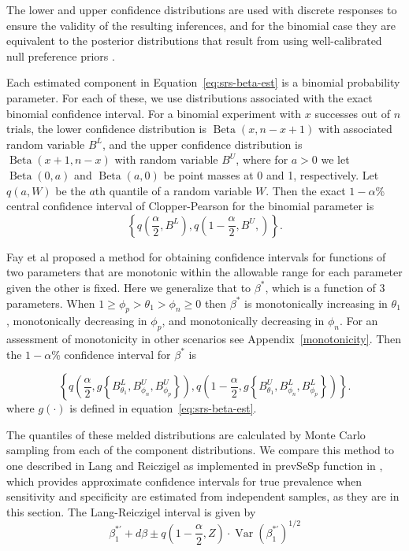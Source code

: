 \documentclass[AMA,STIX1COL]{WileyNJD-v2}
\DeclareMathOperator{\Var}{Var}
\begin{document}
The lower and upper confidence distributions are used with discrete responses to ensure the validity of the resulting inferences, and for the binomial case they are equivalent to the posterior distributions that result from using well-calibrated null preference priors \cite{Fay2021}.

Each estimated component in Equation~\ref{eq:srs-beta-est} is a binomial probability parameter.
For each of these, we use distributions associated with  the exact binomial confidence interval.
For a binomial experiment with \( x \) successes out of \( n \) trials, the lower confidence distribution is \( \operatorname{Beta}(x, n - x + 1) \) with associated random variable \( B^L \), and the upper confidence distribution  is \( \operatorname{Beta}(x + 1, n - x)\) with random variable \( B^U \), where for $a>0$ we let \( \operatorname{Beta}(0,a) \) and \( \operatorname{Beta}(a,0) \) be point masses at 0 and 1, respectively.
Let \( q(a, W) \) be the \( a \)th quantile of a random variable \( W \). Then the exact \( 1 - \alpha \)\% central confidence interval of Clopper-Pearson\cite{10.1093/biomet/26.4.404} for the binomial parameter is 
\begin{equation}
\left\{ q \left( \frac{\alpha}{2}, B^L \right), q \left( 1 - \frac{\alpha}{2}, B^U, \right) \right\}.
\label{eq:C-P}
\end{equation}

Fay et al \cite{FayP:2015} proposed a method for obtaining confidence intervals for functions of two parameters that are monotonic within the allowable range  for each parameter given the other is fixed. Here we generalize that to $\beta^*$, which is a function of 3 parameters. When $1 \geq \phi_p > \theta_1 > \phi_n \geq 0$ then $\beta^*$ is monotonically increasing in $\theta_1$, monotonically decreasing in $\phi_p$, and monotonically decreasing in $\phi_n$.
For an assessment of monotonicity in other scenarios see Appendix~\ref{monotonicity}.
Then the \( 1-\alpha \)\% confidence interval for \( \beta^* \) is 

\begin{equation}
    \left\{ q \left( \frac{\alpha}{2}, g \left\{ B_{\theta_1}^L, B_{\phi_n}^U, B_{\phi_p}^U \right\}   \right),  
            q \left( 1 - \frac{\alpha}{2},  g \left\{ B_{\theta_1}^U, B_{\phi_n}^L, B_{\phi_p}^L \right\}   \right) \right\}.
\label{eq:srs-conf-int}
\end{equation}
where $g(\cdot)$ is defined in equation~\ref{eq:srs-beta-est}.


The quantiles of these melded distributions are calculated by Monte Carlo sampling from each of the component distributions.
We compare this method to one described in Lang and Reiczigel \cite{Lang:2014} as implemented in prevSeSp function in \cite{asht}, which provides approximate confidence intervals for true prevalence when sensitivity and specificity are estimated from independent samples, as they are  in this section.
The Lang-Reiczigel interval is given by
\begin{equation}
\beta_1^{*\prime} + d\beta \pm q\left( 1 - \frac{\alpha}{2}, Z \right) \cdot \Var(\beta_1^{*\prime})^{1/2}    
\end{equation}
\end{document}
